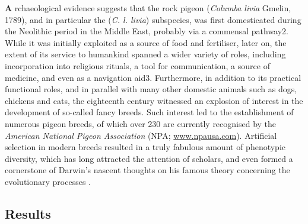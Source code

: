\documentclass[twoside, british, a4paper]{article}
\begin{document}
\begin{multicols}{2}
\lettrine[findent=2pt]{\textbf{A}}{ }rchaeological evidence suggests that the rock pigeon (\textit{Columba livia} Gmelin, 1789), and in particular the (\textit{C. l. livia}) subspecies, was first domesticated during the Neolithic period in the Middle East, probably via a commensal pathway2. While it was initially exploited as a source of food and fertiliser, later on, the extent of its service to humankind spanned a wider variety of roles, including incorporation into religious rituals, a tool for communication, a source of medicine, and even as a navigation aid3. Furthermore, in addition to its practical functional roles, and in parallel with many other domestic animals such as dogs, chickens and cats, the eighteenth century witnessed an explosion of interest in the development of so-called fancy breeds. Such interest led to the establishment of numerous pigeon breeds, of which over 230 are currently recognised by the \textit{American National Pigeon Association} (NPA; \url{www.npausa.com}). Artificial selection in modern breeds resulted in a truly fabulous amount of phenotypic diversity, which has long attracted the attention of scholars, and even formed a cornerstone of Darwin’s nascent thoughts on his famous theory concerning the evolutionary processes \cite{pacheco_darwins_2020}.\
\end{multicols}



\subsection*{Results}

\end{document}

